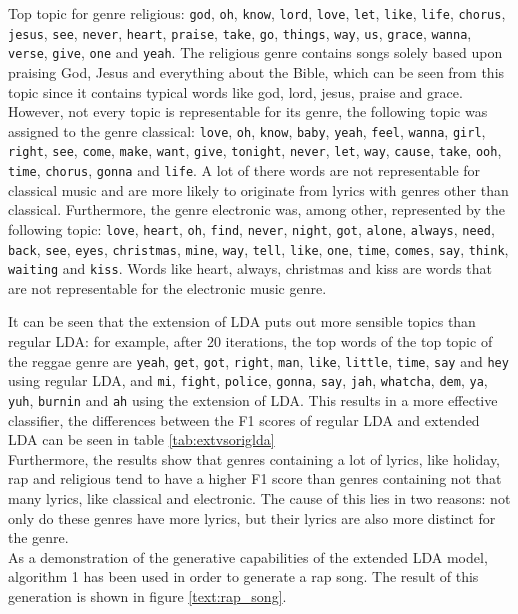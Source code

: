 Top topic for genre religious: \verb|god|, \verb|oh|, \verb|know|, \verb|lord|, \verb|love|, \verb|let|, \verb|like|, \verb|life|, \verb|chorus|, \verb|jesus|, \verb|see|, \verb|never|, \verb|heart|, \verb|praise|, \verb|take|, \verb|go|, \verb|things|, \verb|way|, \verb|us|, \verb|grace|, \verb|wanna|, \verb|verse|, \verb|give|, \verb|one| and \verb|yeah|. The religious genre contains songs solely based upon praising God, Jesus and everything about the Bible, which can be seen from this topic since it contains typical words like god, lord, jesus, praise and grace. \\
However, not every topic is representable for its genre, the following topic was assigned to the genre classical: \verb|love|, \verb|oh|, \verb|know|, \verb|baby|, \verb|yeah|, \verb|feel|, \verb|wanna|, \verb|girl|, \verb|right|, \verb|see|, \verb|come|, \verb|make|, \verb|want|, \verb|give|, \verb|tonight|, \verb|never|, \verb|let|, \verb|way|, \verb|cause|, \verb|take|, \verb|ooh|, \verb|time|, \verb|chorus|, \verb|gonna| and \verb|life|. A lot of there words are not representable for classical music and are more likely to originate from lyrics with genres other than classical. Furthermore, the genre electronic was, among other, represented by the following topic: \verb|love|, \verb|heart|, \verb|oh|, \verb|find|, \verb|never|, \verb|night|, \verb|got|, \verb|alone|, \verb|always|, \verb|need|, \verb|back|, \verb|see|, \verb|eyes|, \verb|christmas|, \verb|mine|, \verb|way|, \verb|tell|, \verb|like|, \verb|one|, \verb|time|, \verb|comes|, \verb|say|, \verb|think|, \verb|waiting| and \verb|kiss|. Words like heart, always, christmas and kiss are words that are not representable for the electronic music genre.


It can be seen that the extension of LDA puts out more sensible topics than regular LDA: for example, after 20 iterations, the top words of the top topic of the reggae genre are \verb|yeah|, \verb|get|, \verb|got|, \verb|right|, \verb|man|, \verb|like|, \verb|little|, \verb|time|, \verb|say| and \verb|hey| using regular LDA, and \verb|mi|, \verb|fight|, \verb|police|, \verb|gonna|, \verb|say|, \verb|jah|, \verb|whatcha|, \verb|dem|, \verb|ya|, \verb|yuh|, \verb|burnin| and \verb|ah| using the extension of LDA. This results in a more effective classifier, the differences between the F1 scores of regular LDA and extended LDA can be seen in table \ref{tab:extvsoriglda} \\
Furthermore, the results show that genres containing a lot of lyrics, like holiday, rap and religious tend to have a higher F1 score than genres containing not that many lyrics, like classical and electronic. The cause of this lies in two reasons: not only do these genres have more lyrics, but their lyrics are also more distinct for the genre. \\ 
As a demonstration of the generative capabilities of the extended LDA model, algorithm 1 has been used in order to generate a rap song. The result of this generation is shown in figure \ref{text:rap_song}.


